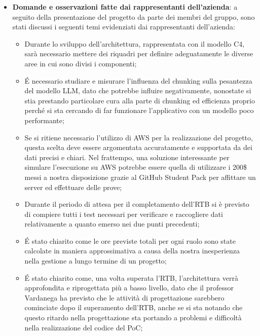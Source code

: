 \begin{itemize}
\begin{itemize}
\begin{itemize}
        \end{itemize}
        \item Il frontend realizzato fino ad oggi, utilizzando Angular;
        \item I container, realizzati utilizzando Docker con il principio \textit{infrastructure as code} per rendere il codice facilmente replicabile e mantenibile;
        \item Il database, che contiene tutti i dati raccolti tramite l'operazione di scraping effettuata sulla documentazione dei prodotti Vimar, realizzato con Postgre e l'utilizzo della sua estensione Vector.
    \end{itemize}
    \item \textbf{Domande e osservazioni fatte dai rappresentanti dell'azienda}: a seguito della presentazione del progetto da parte dei membri del gruppo, sono stati discussi i seguenti temi evidenziati dai rappresentanti dell'azienda:
    \begin{itemize}
        \item Durante lo sviluppo dell'architettura, rappresentata con il modello C4, sarà necessario mettere dei riquadri per definire adeguatamente le diverse aree in cui sono divisi i componenti;
        \item \'E necessario studiare e misurare l'influenza del chunking sulla pesantezza del modello LLM, dato che potrebbe influire negativamente, nonostate si stia prestando particolare cura alla parte di chunking ed efficienza proprio perché si sta cercando di far funzionare l'applicativo con un modello poco performante;
        \item Se si ritiene necessario l'utilizzo di AWS per la realizzazione del progetto, questa scelta deve essere argomentata accuratamente e supportata da dei dati precisi e chiari. Nel frattempo, una soluzione interessante per simulare l'esecuzione su AWS potrebbe essere quella di utilizzare i 200\$ messi a nostra disposizione grazie al GitHub Student Pack per affittare un server ed effettuare delle prove;
        \item Durante il periodo di attesa per il completamento dell'RTB si è previsto di compiere tutti i test necessari per verificare e raccogliere dati relativamente a quanto emerso nei due punti precedenti;
        \item \'E stato chiarito come le ore previste totali per ogni ruolo sono state calcolate in maniera approssimativa a causa della nostra inesperienza nella gestione a lungo termine di un progetto;
        \item \'E stato chiarito come, una volta superata l'RTB, l'architettura verrà approfondita e riprogettata più a basso livello, dato che il professor Vardanega ha previsto che le attività di progettazione sarebbero cominciate dopo il superamento dell'RTB, anche se si sta notando che questo ritardo nella progettazione sta portando a problemi e difficoltà nella realizzazione del codice del PoC;

\end{itemize}
\end{itemize}
